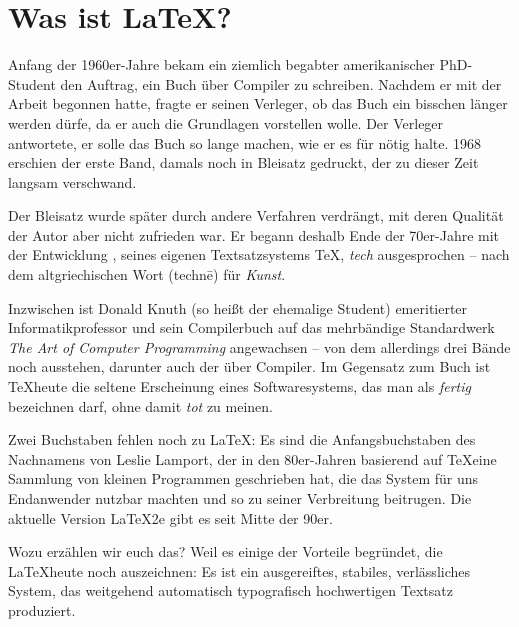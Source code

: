 \section{Was ist \LaTeX?}

Anfang der 1960er-Jahre bekam ein ziemlich begabter amerikanischer PhD-Student den Auftrag, ein Buch über Compiler zu schreiben.
Nachdem er mit der Arbeit begonnen hatte, fragte er seinen Verleger, ob das Buch ein bisschen länger werden dürfe, da er auch die Grundlagen vorstellen wolle.
Der Verleger antwortete, er solle das Buch so lange machen, wie er es für nötig halte.
1968 erschien der erste Band, damals noch in Bleisatz gedruckt, der zu dieser Zeit langsam verschwand.

Der Bleisatz wurde später durch andere Verfahren verdrängt, mit deren Qualität der Autor aber nicht zufrieden war. 
Er begann deshalb Ende der 70er-Jahre mit der Entwicklung , seines eigenen Textsatzsystems \TeX, \emph{tech} ausgesprochen – nach dem altgriechischen Wort \texttau\textepsilon{}\textchi\textnu\texteta{} (technē) für \emph{Kunst}.

Inzwischen ist Donald Knuth (so heißt der ehemalige Student) emeritierter Informatikprofessor und sein Compilerbuch auf das mehrbändige Standardwerk \emph{The Art of Computer Programming} angewachsen – von dem allerdings drei Bände noch ausstehen, darunter auch der über Compiler.
Im Gegensatz zum Buch ist \TeX heute die seltene Erscheinung eines Softwaresystems, das man als \emph{fertig} bezeichnen darf, ohne damit \emph{tot} zu meinen.

Zwei Buchstaben fehlen noch zu \LaTeX: 
Es sind die Anfangsbuchstaben des Nachnamens von Leslie Lamport, der in den 80er-Jahren basierend auf \TeX eine Sammlung von kleinen Programmen geschrieben hat, die das System für uns Endanwender nutzbar machten und so zu seiner Verbreitung beitrugen.
Die aktuelle Version \LaTeX2e gibt es seit Mitte der 90er.

Wozu erzählen wir euch das? 
Weil es einige der Vorteile begründet, die \LaTeX heute noch auszeichnen:
Es ist ein ausgereiftes, stabiles, verlässliches System,
das weitgehend automatisch typografisch hochwertigen Textsatz produziert.



